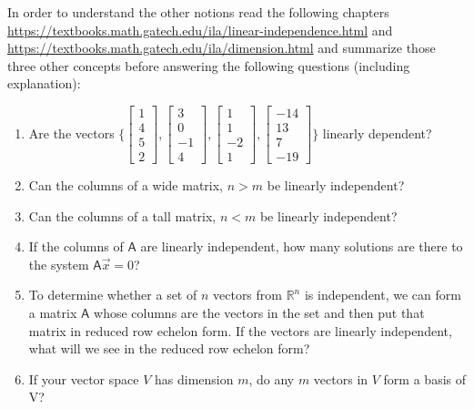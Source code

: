 \documentclass[a4paper, 11pt]{article}
\newcommand{\mat}[1]{\boldsymbol { \mathsf{#1}} }
\begin{document}
\begin{enumerate}
In order to understand the other notions read the following chapters \url{https://textbooks.math.gatech.edu/ila/linear-independence.html} and \url{https://textbooks.math.gatech.edu/ila/dimension.html} and  summarize those three other concepts before answering the following questions (including explanation): 
\begin{enumerate}[label=\alph*)]
\item Are the vectors $\Bigg\{ \begin{bmatrix} 1 \\ 4 \\ 5 \\ 2 \end{bmatrix}, \begin{bmatrix} 3 \\ 0 \\ -1 \\ 4 \end{bmatrix}, \begin{bmatrix} 1 \\ 1 \\ -2 \\ 1
\end{bmatrix}, \begin{bmatrix} -1 4\\ 13 \\ 7 \\ -19
\end{bmatrix}\Bigg\}$ linearly dependent?
\item Can the columns of a wide matrix, $n>m$ be linearly independent?
\item Can the columns of a tall matrix, $n<m$ be linearly independent?
\item  If the columns of $\mat A$ are linearly independent, how many solutions are there to the
system $\mat A \vec x = 0$?
\item  To determine whether a set of $n$ vectors from $\mathbb{R}^n$ is independent, we can form a matrix $\mat A$ whose columns are the vectors in the set and then put that matrix in reduced row
echelon form. If the vectors are linearly independent, what will we see in the reduced
row echelon form?
\item If your vector space $V$ has dimension $m$, do any $m$ vectors in $V$ form a basis of V? 
\end{enumerate}




\end{enumerate}
\end{document}
